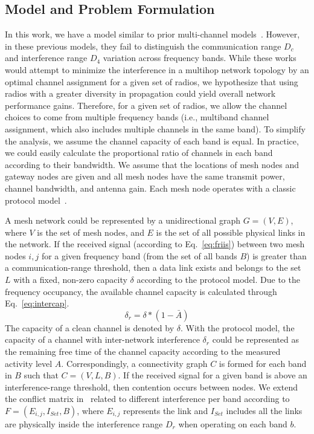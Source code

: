 \subsection{Model and Problem Formulation}
\label{subsec:problem}

In this work, we have a model similar to prior multi-channel models~\cite{tang2005interference,
doraghinejad2014channel,si2010overview}. However, in these previous models, 
they fail to distinguish the communication range $D_c$ and interference range
$D_4$ variation across frequency bands.  
While
these works would attempt to minimize the interference in a multihop network topology
by an optimal channel assignment for a given set of radios, we hypothesize that
using radios with a greater diversity in propagation could yield overall network 
performance gains.  
Therefore, for a given set of radios, we allow the channel
choices to come from multiple frequency bands (i.e., multiband channel 
assignment, which also includes multiple channels in the same band).
To simplify the analysis, we assume the channel capacity of each band is equal.
In practice, we could easily calculate the proportional ratio of channels in 
each band according to their bandwidth.
We assume that the locations of mesh nodes and gateway nodes are given and
all mesh nodes have the same transmit power, channel bandwidth, and antenna gain.
Each mesh node operates with a classic protocol model~\cite{gupta2000capacity}. 

A mesh network could be represented by a unidirectional graph $G=(V,E)$, where
$V$ is the set of mesh nodes, and $E$ is the set of all possible physical links 
in the network. If the received signal (according to Eq.~\ref{eq:friis}) between 
two mesh nodes $i,j$ for a given frequency band (from the set of all bands $B$) 
is greater than a communication-range threshold, then a data link exists and 
belongs to the set $L$ with a fixed, non-zero capacity $\delta$ according to the protocol 
model.  
Due to the frequency occupancy, the available channel capacity is calculated 
through Eq.~\ref{eq:intercap}.
\begin{equation}
\label{eq:intercap}
\delta_r=\delta*(1-\bar{A})
\end{equation}
The capacity of a clean channel is denoted by $\delta$. With the protocol model, the capacity 
of a channel with inter-network interference $\delta_r$ could be represented as 
the remaining free time of the channel capacity according to the measured
activity level $A$.
Correspondingly, a connectivity graph $C$ is formed for each 
band in $B$ such that $C=(V,L,B)$.  If the received signal for a given band is 
above an interference-range threshold, then contention occurs between
nodes.  We extend the conflict matrix in~\cite{tang2005interference} related to
different interference per band according to $F=(E_{i,j},I_{Set},B)$, where $E_{i,j}$
represents the link and $I_{Set}$ includes all the links are physically inside 
the interference range $D_r$ when operating on each band $b$.

